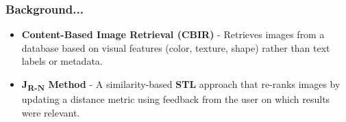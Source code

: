 \begin{frame}
\frametitle{Background...}

\begin{itemize}

    \item \textbf{Content-Based Image Retrieval (\textbf{CBIR})} - Retrieves images from a database based on visual features (color, texture, shape) rather than text labels or metadata.


    \item \textbf{J\textsubscript{R-N} Method} - A similarity-based \textbf{STL} approach that re-ranks images by updating a distance metric using feedback from the user on which results were relevant.

\end{itemize}

\end{frame}
